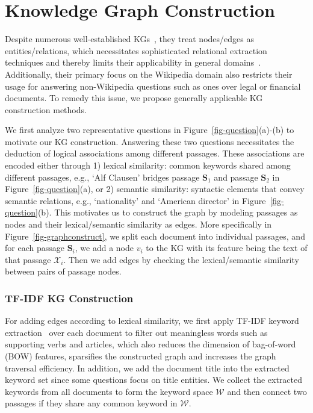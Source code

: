 \section{Knowledge Graph Construction}\label{sec-kgconstruct}
Despite numerous well-established KGs~\cite{hoffart2013yago2, tian2023graph}, they treat nodes/edges as entities/relations, which necessitates sophisticated relational extraction techniques and thereby limits their applicability in general domains~\cite{huang2021knowledge}. Additionally, their primary focus on the Wikipedia domain also restricts their usage for answering non-Wikipedia questions such as ones over legal or financial documents. To remedy this issue, we propose generally applicable KG construction methods.


We first analyze two representative questions in Figure~\ref{fig-question}(a)-(b) to motivate our KG construction. Answering these two questions necessitates the deduction of logical associations among different passages. These associations are encoded either through 1) lexical similarity: common keywords shared among different passages, e.g., `Alf Clausen' bridges passage $\mathbf{S}_1$ and passage $\mathbf{S}_2$ in Figure~\ref{fig-question}(a), or 2) semantic similarity: syntactic elements that convey semantic relations, e.g., `nationality' and `American director' in Figure~\ref{fig-question}(b). This motivates us to construct the graph by modeling passages as nodes and their lexical/semantic similarity as edges. More specifically in Figure~\ref{fig-graphconstruct}, we split each document into individual passages, and for each passage $\mathbf{S}_i$, we add a node $v_i$ to the KG with its feature being the text of that passage $\mathcal{X}_i$. Then we add edges by checking the lexical/semantic similarity between pairs of passage nodes. 

\subsubsection{TF-IDF KG Construction} For adding edges according to lexical similarity, we first
apply TF-IDF keyword extraction~\cite{ramos2003using} over each document to filter out meaningless words such as supporting verbs and articles, which also reduces the dimension of bag-of-word (BOW) features, sparsifies the constructed graph and increases the graph traversal efficiency. In addition, we add the document title into the extracted keyword set since some questions focus on title entities. We collect the extracted keywords from all documents to form the keyword space $\mathcal{W}$ and then connect two passages if they share any common keyword in $\mathcal{W}$.

